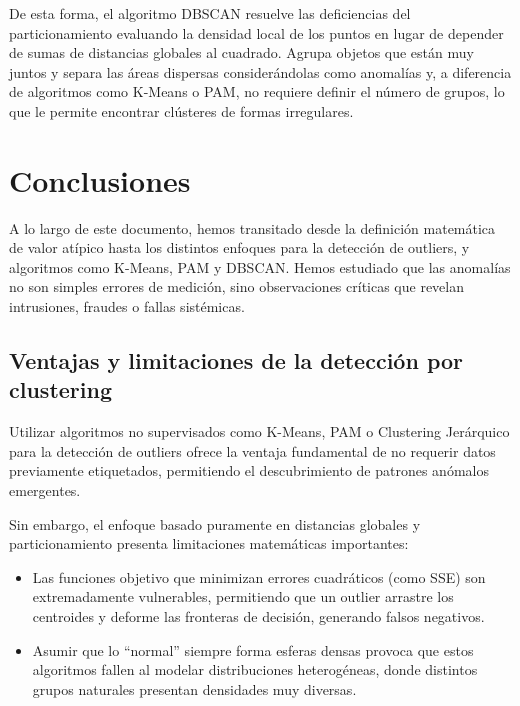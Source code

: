 De esta forma, el algoritmo DBSCAN resuelve las deficiencias del particionamiento evaluando la densidad local de los puntos en lugar de depender de sumas de distancias globales al cuadrado. Agrupa objetos que están muy juntos y separa las áreas dispersas considerándolas como anomalías y, a diferencia de algoritmos como K-Means o PAM, no requiere definir el número de grupos, lo que le permite encontrar clústeres de formas irregulares.

\section{Conclusiones}

A lo largo de este documento, hemos transitado desde la definición matemática de valor atípico hasta los distintos enfoques para la detección de outliers, y algoritmos como K-Means, PAM y DBSCAN. Hemos estudiado que las anomalías no son simples errores de medición, sino observaciones críticas que revelan intrusiones, fraudes o fallas sistémicas.

\subsection{Ventajas y limitaciones de la detección por clustering}

Utilizar algoritmos no supervisados como K-Means, PAM o Clustering Jerárquico para la detección de outliers ofrece la ventaja fundamental de no requerir datos previamente etiquetados, permitiendo el descubrimiento de patrones anómalos emergentes.

Sin embargo, el enfoque basado puramente en distancias globales y particionamiento presenta limitaciones matemáticas importantes:

\begin{itemize}
	
	\item Las funciones objetivo que minimizan errores cuadráticos (como SSE) son extremadamente vulnerables, permitiendo que un outlier arrastre los centroides y deforme las fronteras de decisión, generando falsos negativos.
	
	\item Asumir que lo ``normal'' siempre forma esferas densas provoca que estos algoritmos fallen al modelar distribuciones heterogéneas, donde distintos grupos naturales presentan densidades muy diversas.
	
\end{itemize}


